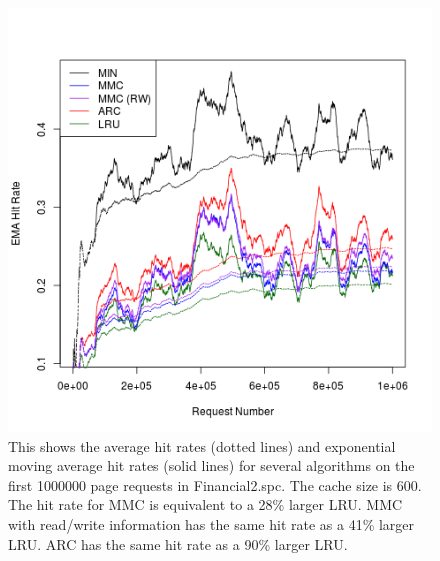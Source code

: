   \begin{figure}
  \centering
  \includegraphics[width=6in]{../media/ts_600_600_2400_3.png}
  \caption[Rolling hit rate for 600 page caches on trace Financial2.spc]{This
  shows the average hit rates (dotted lines) and exponential moving average hit
  rates (solid lines) for several algorithms on the first 1000000 page requests
  in Financial2.spc. The cache size is 600. The hit rate for MMC is equivalent
  to a 28\% larger LRU. MMC with read/write information has the same hit rate as
  a 41\% larger LRU. ARC has the same hit rate as a 90\% larger LRU.}
  \label{fig:ts_600_financial2}
  \end{figure}

